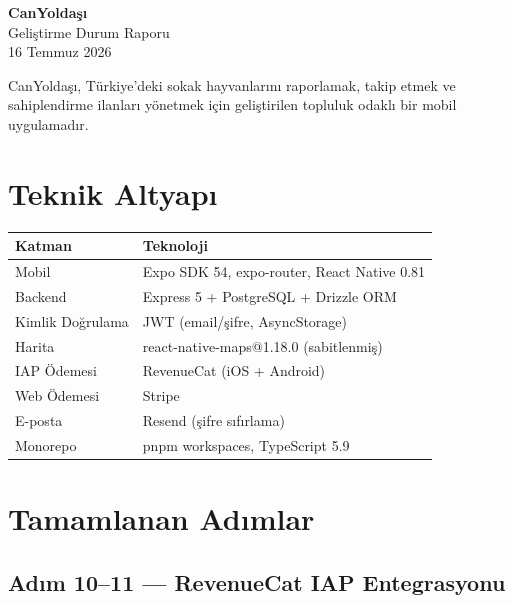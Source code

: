 \documentclass[12pt,a4paper]{article}
\begin{document}
\begin{center}
  {\LARGE\bfseries\color{primary} CanYoldaşı}\\[0.4em]
  {\large Geliştirme Durum Raporu}\\[0.3em]
  {\normalsize\color{gray} 16 Temmuz 2026}
\end{center}

\vspace{1em}
\noindent
CanYoldaşı, Türkiye'deki sokak hayvanlarını raporlamak, takip etmek ve sahiplendirme ilanları
yönetmek için geliştirilen topluluk odaklı bir mobil uygulamadır.
\vspace{1em}

\section{Teknik Altyapı}

\begin{tabularx}{\textwidth}{lX}
  \toprule
  \textbf{Katman} & \textbf{Teknoloji} \\
  \midrule
  Mobil & Expo SDK 54, expo-router, React Native 0.81 \\
  Backend & Express 5 + PostgreSQL + Drizzle ORM \\
  Kimlik Doğrulama & JWT (email/şifre, AsyncStorage) \\
  Harita & react-native-maps@1.18.0 (sabitlenmiş) \\
  IAP Ödemesi & RevenueCat (iOS + Android) \\
  Web Ödemesi & Stripe \\
  E-posta & Resend (şifre sıfırlama) \\
  Monorepo & pnpm workspaces, TypeScript 5.9 \\
  \bottomrule
\end{tabularx}

\section{Tamamlanan Adımlar}

\subsection{Adım 10–11 — RevenueCat IAP Entegrasyonu}
\end{document}
